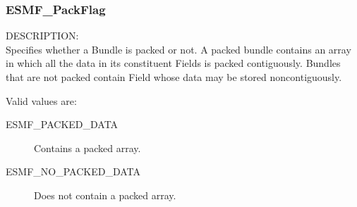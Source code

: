 
\subsubsection{ESMF\_PackFlag}

{\sf DESCRIPTION:\\}
Specifies whether a Bundle is packed or not.  A packed 
bundle contains an array in which all the data in its 
constituent Fields is packed contiguously.  Bundles that
are not packed contain Field whose data may be stored
noncontiguously.

Valid values are:
\begin{description}
   \item [ESMF\_PACKED\_DATA] 
         Contains a packed array.
   \item [ESMF\_NO\_PACKED\_DATA]
         Does not contain a packed array.
\end{description}
